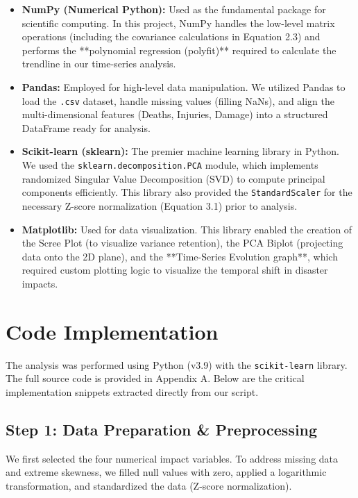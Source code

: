 \documentclass[12pt, a4paper]{report}
\begin{document}
\begin{itemize}
    \item \textbf{NumPy (Numerical Python):} Used as the fundamental package for scientific computing. In this project, NumPy handles the low-level matrix operations (including the covariance calculations in Equation 2.3) and performs the **polynomial regression (polyfit)** required to calculate the trendline in our time-series analysis.
    
    \item \textbf{Pandas:} Employed for high-level data manipulation. We utilized Pandas to load the \texttt{.csv} dataset, handle missing values (filling NaNs), and align the multi-dimensional features (Deaths, Injuries, Damage) into a structured DataFrame ready for analysis.
    
    \item \textbf{Scikit-learn (sklearn):} The premier machine learning library in Python. We used the \texttt{sklearn.decomposition.PCA} module, which implements randomized Singular Value Decomposition (SVD) to compute principal components efficiently. This library also provided the \texttt{StandardScaler} for the necessary Z-score normalization (Equation 3.1) prior to analysis.
    
    \item \textbf{Matplotlib:} Used for data visualization. This library enabled the creation of the Scree Plot (to visualize variance retention), the PCA Biplot (projecting data onto the 2D plane), and the **Time-Series Evolution graph**, which required custom plotting logic to visualize the temporal shift in disaster impacts.
\end{itemize}

\section{Code Implementation}
The analysis was performed using Python (v3.9) with the \texttt{scikit-learn} library. The full source code is provided in Appendix A. Below are the critical implementation snippets extracted directly from our script.

\subsection{Step 1: Data Preparation \& Preprocessing}
We first selected the four numerical impact variables. To address missing data and extreme skewness, we filled null values with zero, applied a logarithmic transformation, and standardized the data (Z-score normalization).
\end{document}
